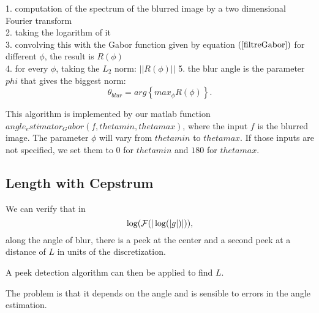 1. computation of the spectrum of the blurred image by a two dimensional Fourier transform\\
2. taking the logarithm of it\\
3. convolving this with the Gabor function given by equation $(\ref{filtreGabor})$ for different $\phi$, the result is $R(\phi)$\\
4. for every $\phi$, taking the $L_2$ norm: $||R(\phi)||$
5. the blur angle is the parameter $phi$ that gives the biggest norm:
\begin{equation}
\theta_{blur} = arg \left\lbrace max_{\phi}R(\phi)\right\rbrace.
\end{equation}

This algorithm is implemented by our matlab function $angle_estimator_Gabor(f,thetamin, thetamax)$, where the input $f$ is the blurred image. The parameter $\phi$ will vary from $thetamin$ to $thetamax$. If those inputs are not specified, we set them to $0$ for $thetamin$ and $180$ for $thetamax$.


\subsection{Length with Cepstrum}
We can verify that in
\[ \log(\mathcal{F}(|\log(|g|)|)), \]
along the angle of blur,
there is a peek at the center and a second peek
at a distance of $L$ in units of the discretization.

A peek detection algorithm can then be applied
to find $L$.

The problem is that it depends on the angle
and is sensible to errors in the angle
estimation.
